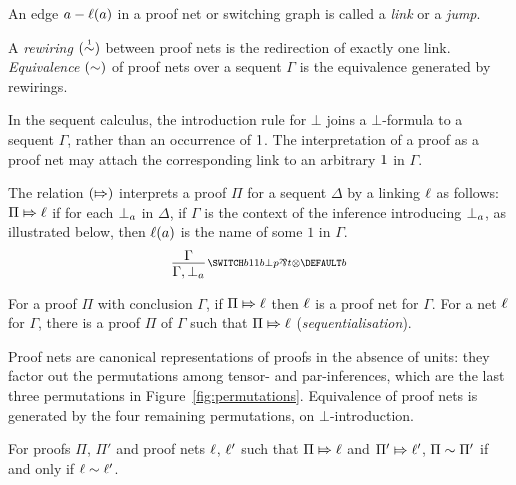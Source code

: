 \documentclass[conference]{IEEEtran}
\begin{document}
\noindent
An edge $a-\ell(a)$ in a proof net or switching graph is called a \emph{link} or a \emph{jump}.
%


\begin{definition}
\label{def:proof net equivalence}
%
A \emph{rewiring} $(\perm*)$ between proof nets is the redirection of exactly one link.
%
\emph{Equivalence} $(\perm)$ of proof nets over a sequent $\Gamma$ is the equivalence generated by rewirings.
%
\end{definition}


\noindent
In the sequent calculus, the introduction rule for $\bot$ joins a $\bot$-formula to a sequent $\Gamma$, rather than an occurrence of $1$.
%
The interpretation of a proof as a proof net may attach the corresponding link to an arbitrary $1$ in $\Gamma$.


\begin{definition}
\label{def:proofs to nets}
%
The relation $(\Mapsto)$ interprets a proof $\Pi$ for a sequent $\Delta$ by a linking $\ell$ as follows:
% 
$\Pi\Mapsto\ell$ if for each $\bot_{a}$ in $\Delta$, if $\Gamma$ is the context of the inference introducing $\bot_{a}$, as illustrated below, then $\ell(a)$ is the name of some $1$ in $\Gamma$.
\[
	\infer[\MLLlabel b]{\Gamma,\named a\bot}{\Gamma}
\]
%
\end{definition}



\begin{proposition}
\label{prop:correctness and sequentialisation}
%
For a proof $\Pi$ with conclusion $\Gamma$, if $\Pi\Mapsto\ell$ then $\ell$ is a proof net for $\Gamma$.
%
For a net $\ell$ for $\Gamma$, there is a proof $\Pi$ of $\Gamma$ such that $\Pi\Mapsto\ell$ (\emph{sequentialisation}).
%
\end{proposition}


\noindent
Proof nets are canonical representations of proofs in the absence of units: they factor out the permutations among tensor- and par-inferences, which are the last three permutations in Figure~\ref{fig:permutations}.
%
Equivalence of proof nets is generated by the four remaining permutations, on $\bot$-introduction.



\begin{proposition}[\cite{HughesMLLProofNets}] %
\label{prop:proof nets work}
%
For proofs $\Pi$, $\Pi'$ and proof nets $\ell$, $\ell'$ such that $\Pi\Mapsto\ell$ and $\Pi'\Mapsto\ell'$, $\Pi\perm\Pi'$ if and only if $\links\perm\links'$.
%
\end{proposition}
\end{document}
